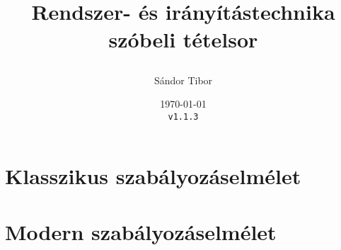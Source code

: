 \documentclass[a4paper,twoside,listof=totoc]{scrbook}
\title{
  Rendszer- és irányítástechnika \\
  szóbeli tételsor

}
\author{Sándor Tibor}
\date{
  \today \\
  \texttt{v1.1.3} \\
}
\numberwithin{equation}{section}
\begin{document}


\tableofcontents
\begingroup
\vfill
\let\cleardoublepage\relax
\listoffigures
\endgroup


\chapter{Klasszikus szabályozáselmélet}









\chapter{Modern szabályozáselmélet}

\setcounter{section}{7}









\end{document}
